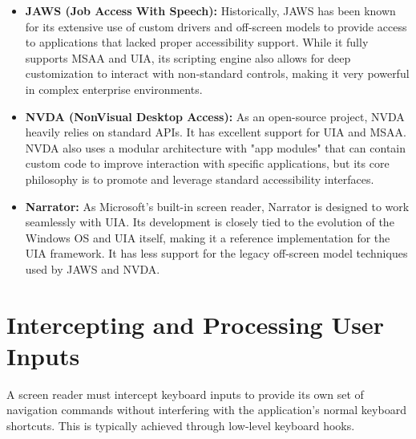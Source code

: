 \begin{itemize}
	\item \textbf{JAWS (Job Access With Speech):} Historically, JAWS has been known for its extensive use of custom drivers and off-screen models to provide access to applications that lacked proper accessibility support. While it fully supports MSAA and UIA, its scripting engine also allows for deep customization to interact with non-standard controls, making it very powerful in complex enterprise environments.
	\item \textbf{NVDA (NonVisual Desktop Access):} As an open-source project, NVDA heavily relies on standard APIs. It has excellent support for UIA and MSAA. NVDA also uses a modular architecture with "app modules" that can contain custom code to improve interaction with specific applications, but its core philosophy is to promote and leverage standard accessibility interfaces.
	\item \textbf{Narrator:} As Microsoft's built-in screen reader, Narrator is designed to work seamlessly with UIA. Its development is closely tied to the evolution of the Windows OS and UIA itself, making it a reference implementation for the UIA framework. It has less support for the legacy off-screen model techniques used by JAWS and NVDA.
\end{itemize}

\section{Intercepting and Processing User Inputs}
\label{sec:intercepting-and-processing-user-inputs}

A screen reader must intercept keyboard inputs to provide its own set of navigation commands without interfering with the application's normal keyboard shortcuts. This is typically achieved through low-level keyboard hooks.

